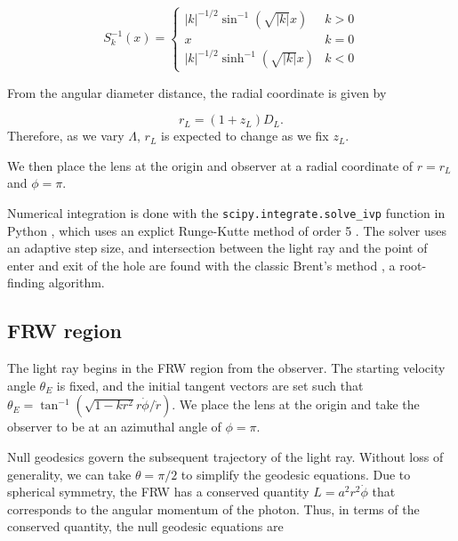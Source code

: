 \begin{equation}
  S_k^{-1}(x) = 
  \begin{cases}
    \mathopen| k \mathclose|^{-1/2} \sin^{-1}(\sqrt{\mathopen| k \mathclose|}x) & k > 0\\
    x & k = 0 \\
    \mathopen| k \mathclose|^{-1/2} \sinh^{-1}(\sqrt{\mathopen| k \mathclose|}x) & k < 0
  \end{cases}
  \label{eq:sk-inverse}
\end{equation}

From the angular diameter distance, the radial coordinate is given by 

\begin{equation}
  r_L = (1+z_L)D_L.
\end{equation}
Therefore, as we vary $\Lambda$, $r_L$ is expected to change as we fix $z_L$. 

We then place the lens at the origin and observer at a radial coordinate of $r = r_L$ and $\phi = \pi$. 

Numerical integration is done with the \texttt{scipy.integrate.solve\_ivp} function in Python \citep{jones2014scipy}, which uses an explict Runge-Kutte method of order 5 \citep{dormand1980family}. The solver uses an adaptive step size, and intersection between the light ray and the point of enter and exit of the hole are found with the classic Brent's method \citep{brent2013algorithms}, a root-finding algorithm. 

\subsection{FRW region}

The light ray begins in the FRW region from the observer. The starting velocity angle $\theta_E$ is fixed, and the initial tangent vectors are set such that $\theta_E = \tan^{-1}(\sqrt{1-kr^2}r\dot{\phi}/\dot{r})$. We place the lens at the origin and take the observer to be at an azimuthal angle of $\phi = \pi$. 

Null geodesics govern the subsequent trajectory of the light ray. Without loss of generality, we can take $\theta = \pi/2$ to simplify the geodesic equations. Due to spherical symmetry, the FRW has a conserved quantity $L = a^2 r^2 \dot{\phi}$ that corresponds to the angular momentum of the photon. Thus, in terms of the conserved quantity, the null geodesic equations are


